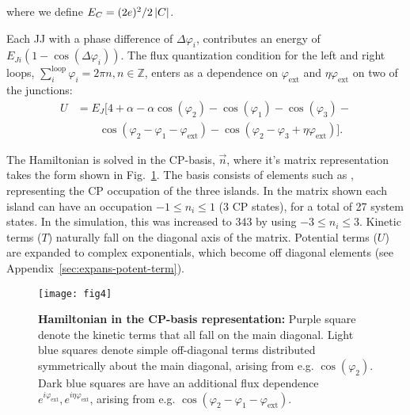 \noindent where we define $ E_{C}={(2e)^{2}}/{2 \left|C\right| } $.

Each   JJ    with   a   phase   difference    of   $\Delta\varphi_{i}$,   contributes   an    energy   of
$ E_{Ji}\left(1 - \cos(\Delta\varphi_i)\right) $.  The flux quantization condition for the left and right
loops,  $  \sum_{i}^{\text{loop}} \varphi_i  =  2\pi  n,  n \in  \mathbb{Z}$,  enters  as a  dependence  on
$ \varphi_\text{ext} $ and $ \eta\varphi_\text{ext} $ on two of the junctions:
\begin{equation}\label{eq:potential}
  \begin{aligned}
    U & = E_J\big[4 + \alpha - \alpha\cos(\varphi_{2}) -\cos(\varphi_{1}) -\cos(\varphi_{3}) - \\
    & \qquad \cos(\varphi_{2} - \varphi_{1} - \varphi_{\text{ext}}) - \cos(\varphi_{2} - \varphi_{3} + \eta\varphi_{\text{ext}})\big].
  \end{aligned}
\end{equation}

The Hamiltonian is solved in the CP-basis,  $\vec{n} $, where it's matrix representation takes
the form shown  in Fig.~\ref{fig:matrix_representation}.  The basis consists  of elements such
as , representing the CP occupation  of the three islands.  In the matrix shown
each island can have an  occupation $ -1 \le n_{i} \le 1$ (3 CP states),  for a total of 27 system
states.  In the  simulation, this was increased to 343  by using $ -3 \le n_{i}  \le 3 $.  Kinetic
terms ($ {T}  $) naturally fall on the diagonal  axis of the matrix.  Potential terms  ($ U $)
are   expanded  to   complex   exponentials,   which  become   off   diagonal  elements   (see
Appendix~\ref{sec:expans-potent-term}).

\begin{figure}[ht]
  \centering \texttt{[image: fig4]}
  \caption{\small \textbf{Hamiltonian in the CP-basis representation:} Purple square denote the kinetic terms that all fall on the main diagonal. Light blue squares denote simple off-diagonal terms distributed symmetrically about the main diagonal, arising from e.g. $\cos(\varphi_2)$. Dark blue squares are have an additional flux dependence $e^{i\varphi_{\text{ext}}}, e^{i\eta\varphi_{\text{ext}}}$, arising from e.g. $\cos(\varphi_2-\varphi_1-\varphi_{\text{ext}})$.
    \label{fig:matrix_representation} }
\end{figure}

